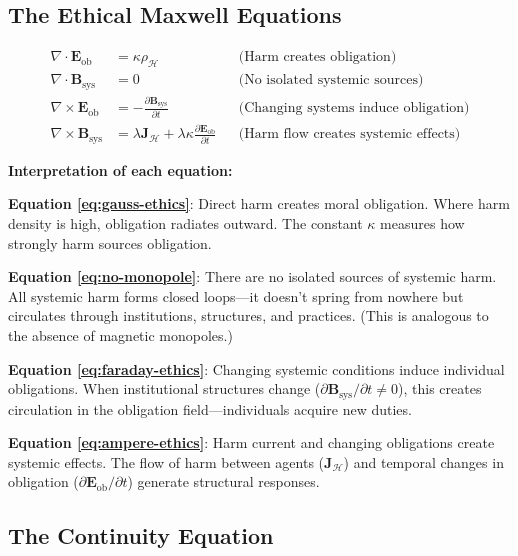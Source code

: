 \documentclass[12pt,letterpaper]{article}
\theoremstyle{definition}
\theoremstyle{remark}
\newcommand{\harm}{\mathcal{H}}
\begin{document}
\subsection{The Ethical Maxwell Equations}

\begin{align}
\nabla \cdot \mathbf{E}_\text{ob} &= \kappa \rho_\harm && \text{(Harm creates obligation)} \label{eq:gauss-ethics} \\
\nabla \cdot \mathbf{B}_\text{sys} &= 0 && \text{(No isolated systemic sources)} \label{eq:no-monopole} \\
\nabla \times \mathbf{E}_\text{ob} &= -\frac{\partial \mathbf{B}_\text{sys}}{\partial t} && \text{(Changing systems induce obligation)} \label{eq:faraday-ethics} \\
\nabla \times \mathbf{B}_\text{sys} &= \lambda \mathbf{J}_\harm + \lambda \kappa \frac{\partial \mathbf{E}_\text{ob}}{\partial t} && \text{(Harm flow creates systemic effects)} \label{eq:ampere-ethics}
\end{align}

\textbf{Interpretation of each equation:}

\textbf{Equation \ref{eq:gauss-ethics}}: Direct harm creates moral obligation. Where harm density is high, obligation radiates outward. The constant $\kappa$ measures how strongly harm sources obligation.

\textbf{Equation \ref{eq:no-monopole}}: There are no isolated sources of systemic harm. All systemic harm forms closed loops---it doesn't spring from nowhere but circulates through institutions, structures, and practices. (This is analogous to the absence of magnetic monopoles.)

\textbf{Equation \ref{eq:faraday-ethics}}: Changing systemic conditions induce individual obligations. When institutional structures change ($\partial \mathbf{B}_\text{sys}/\partial t \neq 0$), this creates circulation in the obligation field---individuals acquire new duties.

\textbf{Equation \ref{eq:ampere-ethics}}: Harm current and changing obligations create systemic effects. The flow of harm between agents ($\mathbf{J}_\harm$) and temporal changes in obligation ($\partial \mathbf{E}_\text{ob}/\partial t$) generate structural responses.

\subsection{The Continuity Equation}
\end{document}
